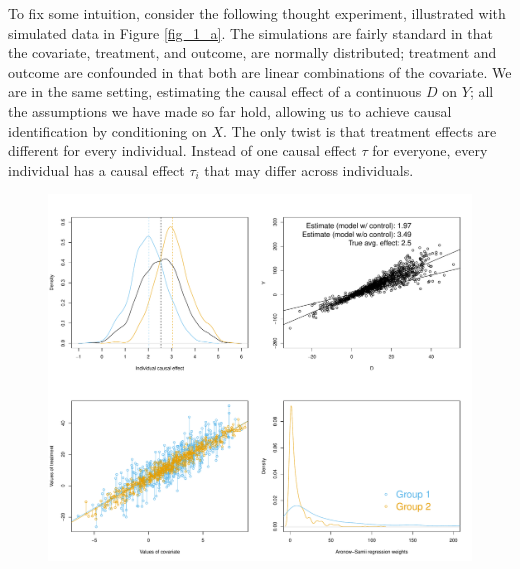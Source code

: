 \documentclass[hidelinks,11pt]{article}
\begin{document}
To fix some intuition, consider the following thought experiment, illustrated with simulated data in Figure \ref{fig_1_a}. The simulations are fairly standard in that the covariate, treatment, and outcome, are normally distributed; treatment and outcome are confounded in that both are linear combinations of the covariate. We are in the same setting, estimating the causal effect of a continuous $D$ on $Y$; all the assumptions we have made so far hold, allowing us to achieve causal identification by conditioning on $X$. The only twist is that treatment effects are different for every individual. Instead of one causal effect $\tau$ for everyone, every individual has a causal effect $\tau_i$ that may differ across individuals.

\begin{figure}
  \includegraphics[width=\linewidth]{../plots/fig_1_a.pdf}

\end{figure}
\end{document}
